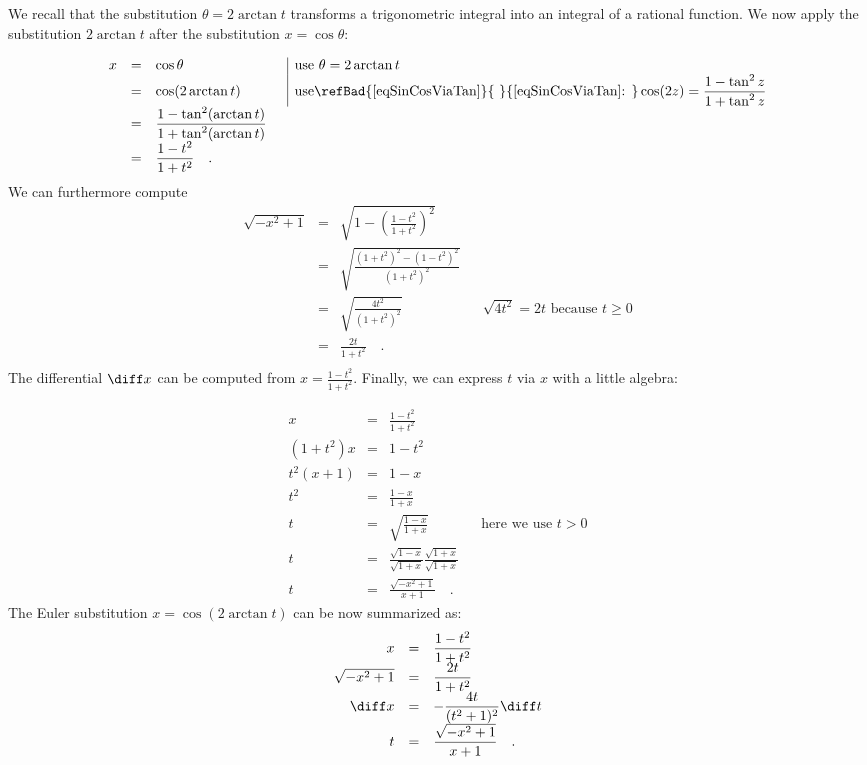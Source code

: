 We recall that the substitution $\theta = 2\arctan t$ transforms a trigonometric integral into an integral of a rational function. We now apply the substitution $2\arctan t$ after the substitution $x=\cos \theta$:

\begin{equation*}
\begin{array}{rcll|l}
x&=&\displaystyle \cos \theta &&\text{use } \theta=2\arctan t\\
&=&\displaystyle \cos (2\arctan t) &&\text{use\refBad{\ref{eqSinCosViaTan}}{ }{\eqref{eqSinCosViaTan}: }}\displaystyle \cos (2z) = \frac{ 1-\tan^2 z }{1+ \tan^2 z}\\
&=&\displaystyle \frac{1-\tan^2(\arctan t)}{1+\tan^2( \arctan t)} \\
&=&\displaystyle \frac{1-t^2}{1+t^2} \quad .
\end{array}
\end{equation*}
We can furthermore compute
\begin{equation}\label{eqsqrt1minusxsquaredE2}
\begin{array}{rcll|l}
\sqrt{-x^2+1 }&=&\displaystyle \sqrt{1- \left(\frac{1-t^2}{1+t^2}\right)^2}\\
&=&\displaystyle \sqrt{\frac{(1+t^2)^2-(1-t^2)^2}{(1+t^2)^2} }\\
&=&\displaystyle \sqrt{\frac{4t^2}{(1+t^2)^2}} &&\displaystyle \sqrt{4t^2}=2t\text{ because } t\geq 0\\
&=&\displaystyle \frac{2t}{1+t^2}\quad .\\
\end{array}
\end{equation}
The differential $\diff x$ can be computed from $x=\frac{1-t^2}{1+t^2}$. Finally, we can express $t$ via $x$ with a little algebra:

\[
\begin{array}{rcll|l}
\displaystyle x&=&\displaystyle \frac{1-t^2}{1+t^2}\\
\displaystyle (1+t^2)x&=&\displaystyle 1-t^2\\
\displaystyle t^2(x+1)&=&\displaystyle 1-x\\
\displaystyle t^2&=&\displaystyle \frac{1-x}{1+x}\\
\displaystyle t&=&\displaystyle \sqrt{\frac{1-x}{1+x}}&& \text{here we use } t>0\\
\displaystyle t&=&\displaystyle \frac{\sqrt{1-x}}{\sqrt{ 1+x}} \frac{ \sqrt{1+x}}{\sqrt{1+x}} \\
\displaystyle t&=&\displaystyle \frac{\sqrt{-x^2+1}}{x+1}\quad .
\end{array}
\]
The Euler substitution $x= \cos (2\arctan t)$ can be now summarized as:
\[
\begin{array}{rcl}
x&=&\displaystyle \frac{1-t^2}{1+t^2}\\
\sqrt{-x^2+1}&=&\displaystyle \frac{2t}{1+t^2}  \\
\diff x&=&\displaystyle  -\frac{4 t}{(t^{2}+1)^{2}} \diff t\\
t&=&\displaystyle \frac{\sqrt{-x^2+1}}{x+1} \quad .
\end{array}
\]